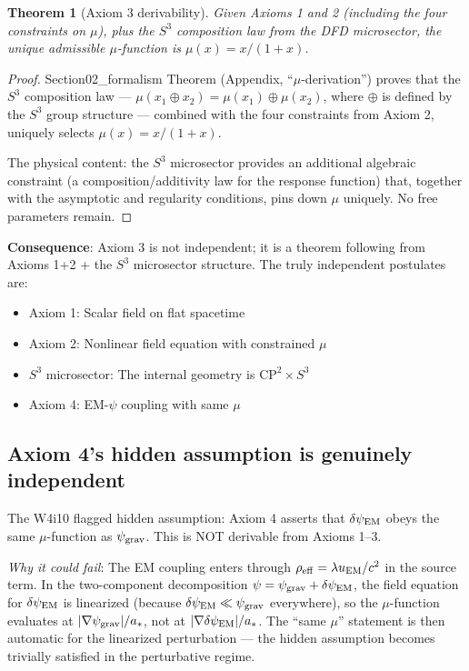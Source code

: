 \documentclass[11pt]{article}
\newtheorem{theorem}{Theorem}
\begin{document}
\begin{theorem}[Axiom 3 derivability]
\label{thm:axiom3}
Given Axioms 1 and 2 (including the four constraints on $\mu$), plus
the $S^3$ composition law from the DFD microsector, the unique
admissible $\mu$-function is $\mu(x) = x/(1+x)$.
\end{theorem}

\begin{proof}
Section02\_formalism Theorem (Appendix, ``$\mu$-derivation'') proves
that the $S^3$ composition law ---
$\mu(x_1 \oplus x_2) = \mu(x_1) \oplus \mu(x_2)$, where $\oplus$ is
defined by the $S^3$ group structure --- combined with the four
constraints from Axiom 2, uniquely selects $\mu(x) = x/(1+x)$.

The physical content: the $S^3$ microsector provides an additional
algebraic constraint (a composition/additivity law for the response
function) that, together with the asymptotic and regularity conditions,
pins down $\mu$ uniquely. No free parameters remain.
\end{proof}

\textbf{Consequence}: Axiom 3 is not independent; it is a theorem
following from Axioms 1+2 + the $S^3$ microsector structure.
The truly independent postulates are:
\begin{itemize}[nosep]
\item Axiom 1: Scalar field on flat spacetime
\item Axiom 2: Nonlinear field equation with constrained $\mu$
\item $S^3$ microsector: The internal geometry is $\text{CP}^2 \times S^3$
\item Axiom 4: EM-$\psi$ coupling with same $\mu$
\end{itemize}

\subsection{Axiom 4's hidden assumption is genuinely independent}

The W4i10 flagged hidden assumption: Axiom 4 asserts that $\delta\psi_{\rm EM}$
obeys the same $\mu$-function as $\psi_{\rm grav}$. This is NOT
derivable from Axioms 1--3.

\textit{Why it could fail}: The EM coupling enters through
$\rho_{\rm eff} = \lambda u_{\rm EM}/c^2$ in the source term.
In the two-component decomposition $\psi = \psi_{\rm grav} +
\delta\psi_{\rm EM}$, the field equation for $\delta\psi_{\rm EM}$
is linearized (because $\delta\psi_{\rm EM} \ll \psi_{\rm grav}$
everywhere), so the $\mu$-function evaluates at
$|\nabla\psi_{\rm grav}|/a_*$, not at $|\nabla\delta\psi_{\rm EM}|/a_*$.
The ``same $\mu$'' statement is then automatic for the linearized
perturbation --- the hidden assumption becomes trivially satisfied
in the perturbative regime.
\end{document}
